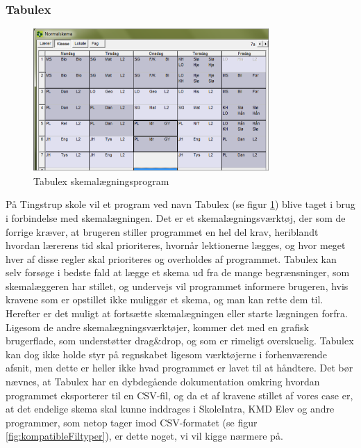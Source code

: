 \subsubsection{Tabulex}
\begin{figure}[h!]
	\centering
	\includegraphics[width=0.8\textwidth]{../Billeder/TabulexPicture.png}
	\caption{Tabulex skemalægningsprogram\cite{Tabulex}}
	\label{fig:TabulexPicture}
\end{figure}
\FloatBarrier
På Tingstrup skole vil et program ved navn Tabulex (se figur \ref{fig:TabulexPicture}) blive taget i brug i forbindelse med skemalægningen. Det er et skemalægningsværktøj, der som de forrige kræver, at brugeren stiller programmet en hel del krav, heriblandt hvordan lærerens tid skal prioriteres, hvornår lektionerne lægges, og hvor meget hver af disse regler skal prioriteres og overholdes af programmet\cite{Tabulex}. Tabulex kan selv forsøge i bedste fald at lægge et skema ud fra de mange begrænsninger, som skemalæggeren har stillet, og undervejs vil programmet informere brugeren, hvis kravene som er opstillet ikke muliggør et skema, og man kan rette dem til. Herefter er det  muligt at fortsætte skemalægningen eller starte lægningen forfra. Ligesom de andre skemalægningsværktøjer, kommer det med en grafisk brugerflade, som understøtter drag\&drop, og som er rimeligt overskuelig. Tabulex kan dog ikke holde styr på regnskabet ligesom værktøjerne i forhenværende afsnit, men dette er heller ikke hvad programmet er lavet til at håndtere. Det bør nævnes, at Tabulex har en dybdegående dokumentation omkring hvordan programmet eksporterer til en CSV-fil\cite{Tabulex_csv}, og da et af kravene stillet af vores case er, at det endelige skema skal kunne inddrages i SkoleIntra, KMD Elev og andre programmer\cite{interview_Kaerby}, som netop tager imod CSV-formatet (se figur \ref{fig:kompatibleFiltyper}), er dette noget, vi vil kigge nærmere på.
